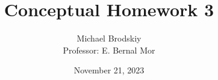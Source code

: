 


\title{Conceptual Homework 3}
\date{November 21, 2023}
\author{Michael Brodskiy\\ \small Professor: E. Bernal Mor}



\maketitle

